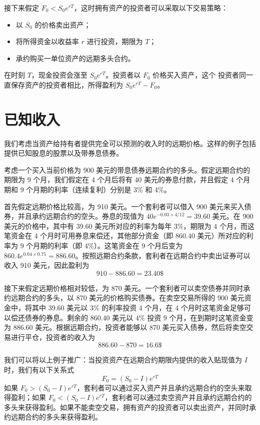 接下来假定 $F_0<S_0e^{rT}$，这时拥有资产的投资者可以采取以下交易策略：
\begin{itemize}
    \item 以 $S_0$ 的价格卖出资产；
    \item 将所得资金以收益率 $r$ 进行投资，期限为 $T$；
    \item 承约购买一单位资产的远期多头合约。
\end{itemize}
在时刻 $T$，现金投资会涨至 $S_0e^{rT}$。投资者以 $F_0$ 价格买入资产，这个
投资者同一直保存资产的投资者相比，所得盈利为 $S_0e^{rT}-F_0$。

\section{已知收入}
我们考虑当资产给持有者提供完全可以预测的收入时的远期价格。这样的例子包括提供已知股息的股票以及带券息债券。

考虑一个买入当前价格为 900 美元的带息债券远期合约的多头。假定远期合约的期限为 9 个月，我们假定在 4 个月后将有 40 美元的券息付款，并且假定 4 个月期和 9 个月期的利率（连续复利）分别是 3\% 和 4\%。

首先假定远期价格比较高，为 910 美元。一个套利者可以借入 900 美元来买入债券，并且承约远期合约的空头。券息的现值为 $40e^{-0.03\times 4/12}=39.60$ 美元。在 $900$ 美元的价格中，其中有 $39.60$ 美元所对应的利率为每年 3\%，期限为 4 个月，而这笔资金在 4 个月时可用券息来偿还，其他部分资金（即 $860.40$ 美元）所对应的利率为 9 个月期的利率（即 4\%）。这笔资金在 9 个月后变为 $860.4e^{0.04\times 0.75}=886.60$。按照远期合约条款，套利者在远期合约中卖出证券可以收入 910 美元，因此盈利为
$$910-886.60=23.40 \$$$

    接下来假定远期价格相对较低，为 870 美元。一个套利者可以卖空债券并同时承约远期合约的多头，以 870 美元的价格购买债券。在卖空交易所得的 900 美元资金中，将其中 39.60 美元以 3\% 的利率投资 4 个月，在 4 个月时这笔资金足够可以偿还债券的券息。剩余的 860.40 美元以 4\% 投资 9 个月，在到期时这笔资金变为 886.60 美元。根据远期合约，投资者能够以 870 美元买入债券，然后将卖空交易进行平仓，投资者的收入为
    $$886.60-870=16.6 \$$$

我们可以将以上例子推广：当投资资产在远期合约期限内提供的收入贴现值为 $I$ 时，我们有以下关系式
\begin{equation}\label{eq5-2}
    F_0=(S_0-I)e^{rT}
\end{equation}
如果 $F_0>(S_0-I)e^{rT}$，套利者可以通过买入资产并且承约远期合约的空头来取得盈利；如果 $F_0<(S_0-I)e^{rT}$，套利者可以通过卖空资产并且承约远期合约的多头来获得盈利。如果不能卖空交易，拥有资产的投资者可以卖出资产，并同时承约远期合约的多头来获得盈利。
